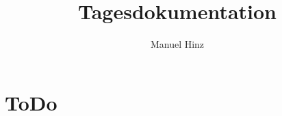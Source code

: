 \documentclass{article}
\author{Manuel Hinz}
\title{Tagesdokumentation}
\begin{document}
\maketitle

\section{ToDo}
\end{document}
